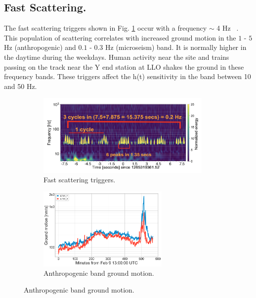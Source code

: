 \documentclass[12pt]{iopart}
\begin{document}
\subsection{Fast Scattering.}
The fast scattering triggers shown in Fig. \ref{fig:fastscat} occur with a frequency $\sim$ 4 Hz ~\cite{alogjosh}. This population of scattering correlates with increased ground motion in the  $1$ - $5$ Hz (anthropogenic) and $0.1$ - $0.3$ Hz (microseism) band. It is normally higher in the daytime during the weekdays. Human activity near the site and trains passing on the track near the Y end station at LLO shakes the ground in these frequency bands. 
These triggers affect the h(t) sensitivity in the band between 10 and 50 Hz.
\begin{figure}
\captionsetup[subfigure]{font=scriptsize,labelfont=scriptsize}
   \begin{minipage}{0.45\textwidth}
   \begin{subfigure}[b]{\textwidth}
        \centering
         \includegraphics[width=\textwidth,height=4cm]{fast_scat11.png}
         \caption{Fast scattering triggers.}
         \label{fig:fastscat}
    \end{subfigure}
    \end{minipage}
    \begin{minipage}{0.45\textwidth}
    \begin{subfigure}{\textwidth}
    \includegraphics[width=\textwidth,height=4cm]{anthro_motion1.png}
    \caption{Anthropogenic band ground motion.} \label{subfig:anthro}
    \end{subfigure}


\end{minipage}
\end{figure}
\end{document}
